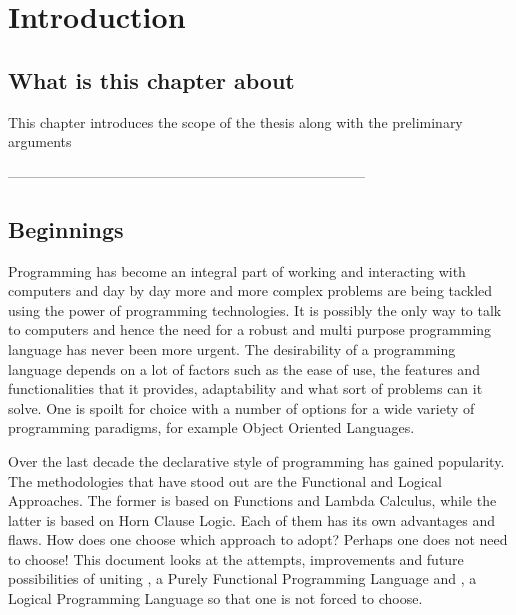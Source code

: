 \documentclass[thesis-solanki.tex]{subfiles}
\begin{document}
\chapter{Introduction}\label{chap:introduction}


\section{What is this chapter about}

This chapter introduces the scope of the thesis along with the preliminary arguments  


-----------------------------------------------------------------------------


\section{Beginnings}
\begin{comment}
Computers have become a part of everyone's life. From the ones in our pockets to the ones on desks or in our school bags, working or in fact living without 
them is difficult if not impossible. All the more reason to know how to use one. Simply speaking just using a computer these days is not enough. To be able 
to utilise their true potential, one must go deeper and communicate with them. This is where the art of programming steps in.     
\end{comment}

\par Programming has become an integral part of working and interacting with computers and day by day more and more complex problems are 
being tackled using the power of programming technologies. It is possibly the only way to talk to computers and hence the need for a robust 
and multi purpose programming language has never been more urgent. The desirability of a programming language depends on a lot of factors 
such as the ease of use, the features and functionalities that it provides, adaptability and what sort of problems can it solve. One is  
spoilt for choice with a number of options for a wide variety of programming paradigms, for example Object Oriented Languages. 

Over the last decade the declarative style of programming has gained 
popularity. The methodologies that have stood out are the Functional and Logical Approaches. The former is based on Functions and Lambda 
Calculus, while the latter is based on Horn Clause Logic. Each of them has its own advantages and ﬂaws. How does one choose which approach 
to adopt? Perhaps one does not need to choose! This document looks at the attempts, improvements and future possibilities of uniting 
, a Purely Functional Programming Language and , a Logical Programming Language so that one is not 
forced to choose.
\end{document}
